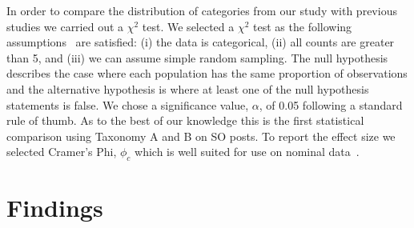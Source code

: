 In order to compare the distribution of categories from our study with previous studies we carried out a \(\chi^2\) test. We selected a \(\chi^2\) test as the following assumptions~\citep{Sheskin:2003tx} are satisfied: (i) the data is categorical, (ii) all counts are greater than 5, and (iii) we can assume simple random sampling. The null hypothesis describes the case where each population has the same proportion of observations and the alternative hypothesis is where at least one of the null hypothesis statements is false. We chose a significance value, \(\alpha\), of 0.05 following a standard rule of thumb. As to the best of our knowledge this is the first statistical comparison using Taxonomy A and B on SO posts. To report the effect size we selected Cramer's Phi, \(\phi_c\) which is well suited for use on nominal data~\citep{Sheskin:2003tx}.



\section{Findings}  
\label{icse2020:sec:findings}
%
% 

